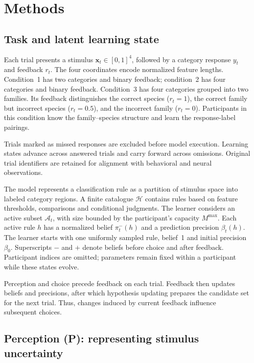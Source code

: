 \section*{Methods}

\subsection*{Task and latent learning state}
\label{m:task}

Each trial presents a stimulus $\bm x_t\in[0,1]^4$, followed by a category response $y_t$ and feedback $r_t$. The four coordinates encode normalized feature lengths. Condition~1 has two categories and binary feedback; condition~2 has four categories and binary feedback. Condition~3 has four categories grouped into two families. Its feedback distinguishes the correct species ($r_t=1$), the correct family but incorrect species ($r_t=0.5$), and the incorrect family ($r_t=0$). Participants in this condition know the family--species structure and learn the response-label pairings.

Trials marked as missed responses are excluded before model execution. Learning states advance across answered trials and carry forward across omissions. Original trial identifiers are retained for alignment with behavioral and neural observations.

\label{m:state}
The model represents a classification rule as a partition of stimulus space into labeled category regions. A finite catalogue $\mathcal H$ contains rules based on feature thresholds, comparisons and conditional judgments. The learner considers an active subset $\mathcal A_t$, with size bounded by the participant's capacity $M^{\max}$. Each active rule $h$ has a normalized belief $\pi_t^-(h)$ and a prediction precision $\beta_t(h)$. The learner starts with one uniformly sampled rule, belief~1 and initial precision $\beta_0$. Superscripts $-$ and $+$ denote beliefs before choice and after feedback. Participant indices are omitted; parameters remain fixed within a participant while these states evolve.

Perception and choice precede feedback on each trial. Feedback then updates beliefs and precisions, after which hypothesis updating prepares the candidate set for the next trial. Thus, changes induced by current feedback influence subsequent choices.


\subsection*{Perception (P): representing stimulus uncertainty}
\label{m:perception}

